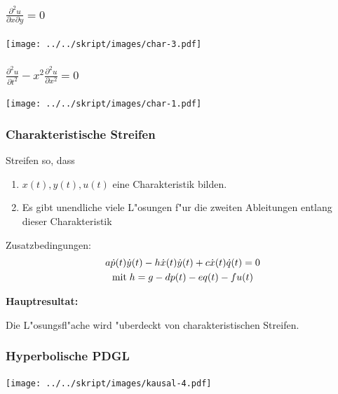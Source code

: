 \documentclass[handout]{beamer}
\begin{document}
\begin{frame}
\frametitle{$\displaystyle \frac{\partial^2 u}{\partial x\partial y}=0$}
\pause
\begin{center}
\texttt{[image: ../../skript/images/char-3.pdf]}
\end{center}
\end{frame}

\begin{frame}
\frametitle{$\displaystyle \frac{\partial^2u}{\partial t^2}-x^2\frac{\partial^2 u}{\partial x^2}=0$}
\pause
\begin{center}
\texttt{[image: ../../skript/images/char-1.pdf]}
\end{center}
\end{frame}

\begin{frame}
\frametitle{Charakteristische Streifen}
Streifen so, dass
\begin{enumerate}
\item
$x(t), y(t), u(t)$ eine Charakteristik bilden.
\item
Es gibt unendliche viele L"osungen f"ur die zweiten Ableitungen entlang
dieser Charakteristik
\end{enumerate}

Zusatzbedingungen:
\begin{gather*}
a\dot p(t)\dot y(t)
-
h \dot x(t) \dot y(t)
+
c \dot x(t)\dot q(t)=0
\\
\text{mit\;}
h=g-dp(t)-eq(t)-fu(t)
\end{gather*}

\bigskip

{\bf Hauptresultat:}
\medskip

\begin{theorem}
Die L"osungsfl"ache wird "uberdeckt von charakteristischen Streifen.
\end{theorem}

\end{frame}

\begin{frame}
\frametitle{Hyperbolische PDGL}
\begin{center}
\texttt{[image: ../../skript/images/kausal-4.pdf]}
\end{center}
\end{frame}
\end{document}
